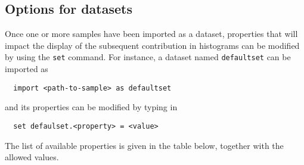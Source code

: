 \documentclass[a4paper]{article}
\begin{document}
\vspace{2cm}
\begin{shaded}
\section{\Large Options for datasets}
\label{sec:datasets}
\end{shaded}

\noindent Once one or more samples have been imported as a dataset, properties that will
impact the display of the subsequent contribution in histograms can be modified
by using the \verb+set+ command. For instance, a dataset named \verb?defaultset?
can be imported as
{\color{ao} \begin{verbatim}
  import <path-to-sample> as defaultset
\end{verbatim}}
\noindent and its properties can be modified by typing in
{\color{ao} \begin{verbatim}
  set defaulset.<property> = <value>
\end{verbatim}}
\noindent The list of available properties is given in the table below, together with the
allowed values.
\renewcommand{\arraystretch}{1.2}%
\end{document}

